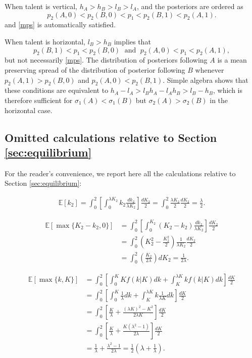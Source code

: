 \documentclass[12pt,american]{paper}
\theoremstyle{remark}
\begin{document}
%
When talent is vertical, $h_A>h_B>l_B>l_A$, and
the posteriors are ordered as
\begin{equation*}
p_2(A,0)<p_2(B,0)<p_1<p_2(B,1)<p_2(A,1).
\end{equation*} 
and \eqref{mps} is automatically satisfied.

%
When talent is horizontal,  $l_B>h_B$ implies that 
\[  p_2(B,1)<p_1<p_2(B,0) \;\text{ and }\; p_2(A,0)<p_1<p_2(A,1), \]
but not necessarily \eqref{mps}. The distribution of posteriors following $A$ is a mean preserving spread of the distribution of posterior following $B$ whenever $p_2(A,1)>p_2(B,0)$ and $p_2(A,0)<p_2(B,1)$. Simple algebra shows that these conditions are equivalent to $h_A-l_A>l_Bh_A-l_Ah_B >l_B-h_B$, which is therefore sufficient for $\sigma_1(A)<\sigma_1(B)$ but $\sigma_2(A)>\sigma_2(B)$ in the horizontal case.
%




\subsection*{Omitted calculations relative to Section \ref{sec:equilibrium}}\label{omitted calculations}

For the reader's convenience, we report here all the calculations relative to Section \ref{sec:equilibrium}:

\begin{align*}
\mathbb E[k_2]=\int_0^2 \left[ \int_0^{\lambda K_2} k_2 \frac{dk_2}{\lambda K_2} \right] \frac{dK_2}{2}= \int_0^2 \frac{\lambda K_2}{2} \frac{dK_2}{2} =\frac{\lambda}{2}.
\end{align*}

\begin{align*}
\mathbb E[\max\{K_2-k_2,0\}]&=\int_0^2 \left[ \int_0^{ K_2}(K_2- k_2) \frac{dk_2}{\lambda K_2} \right] \frac{dK_2}{2}\\
&= \int_0^2 \left(K^2_2 - \frac{K^2_2}{2} \right) \frac{1}{\lambda K_2}  \frac{dK_2}{2}\\
&= \int_0^2 \left(\frac{K_2}{2\lambda} \right) dK_2= \frac{1}{2\lambda}.
\end{align*}

\begin{align*}
\mathbb E[\max\{k,K\}] &=\int_0^2 \left[\int_0^K K f(k|K)dk+\int_K^{\lambda K} k f(k|K)dk \right]\frac{dK}{2}\\
&= \int_0^2 \left[\int_0^K \frac{1}{\lambda }dk+\int_K^{\lambda K} k \frac{1}{\lambda K}dk\right]\frac{dK}{2}\\
&=\int_0^2 \left[\frac{K}{\lambda}+\frac{(\lambda K)^2 -K^2}{2\lambda K}\right]\frac{dK}{2}\\
&=\int_0^2 \left[\frac{K}{\lambda}+ \frac{K(\lambda^2 -1)}{2\lambda}\right]\frac{dK}{2}\\
&=\frac{1}{\lambda}+\frac{\lambda^2 -1}{2\lambda}=\frac{1}{2}\left(\lambda + \frac{1}{\lambda} \right).
\end{align*}
\end{document}
